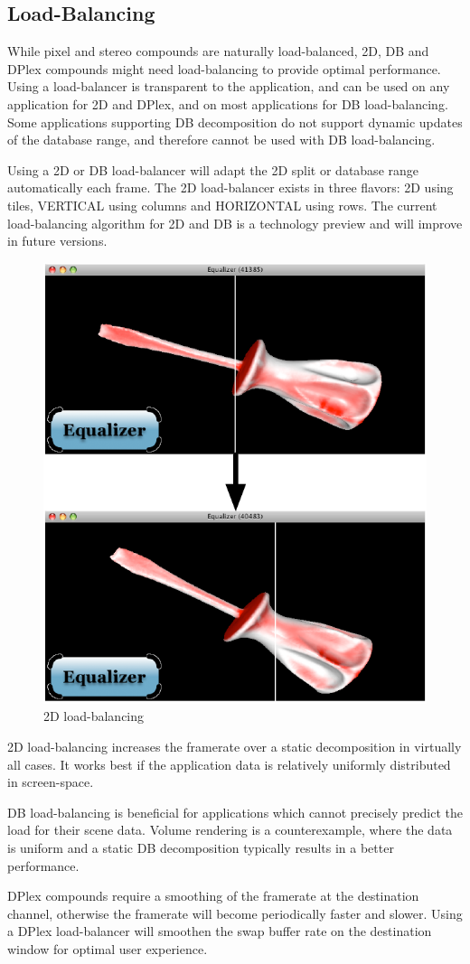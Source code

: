 \documentclass[10pt,a4]{scrartcl}
\begin{document}
\subsection{\label{sLoadBalancing}Load-Balancing}

While pixel and stereo compounds are naturally load-balanced, 2D, DB and
DPlex compounds might need load-balancing to provide optimal
performance. Using a load-balancer is transparent to the application,
and can be used on any application for 2D and DPlex, and on most
applications for DB load-balancing. Some applications supporting DB
decomposition do not support dynamic updates of the database range, and
therefore cannot be used with DB load-balancing.

Using a 2D or DB load-balancer will adapt the 2D split or database range
automatically each frame. The 2D load-balancer exists in three flavors:
\textsf{2D} using tiles, \textsf{VERTICAL} using columns and
\textsf{HORIZONTAL} using rows. The current load-balancing algorithm for
2D and DB is a technology preview and will improve in future versions.

\begin{figure}
  \includegraphics[width=.382\textwidth]{images/lb.pdf}
  {\caption{\label{fLoadBalancing}\small 2D load-balancing}}
\end{figure}
2D load-balancing increases the framerate over a static decomposition in
virtually all cases. It works best if the application data is relatively
uniformly distributed in screen-space.

DB load-balancing is beneficial for applications which cannot precisely
predict the load for their scene data. Volume rendering is a
counterexample, where the data is uniform and a static DB decomposition
typically results in a better performance.

DPlex compounds require a smoothing of the framerate at the destination
channel, otherwise the framerate will become periodically faster and
slower. Using a DPlex load-balancer will smoothen the swap buffer rate
on the destination window for optimal user experience.
\end{document}
